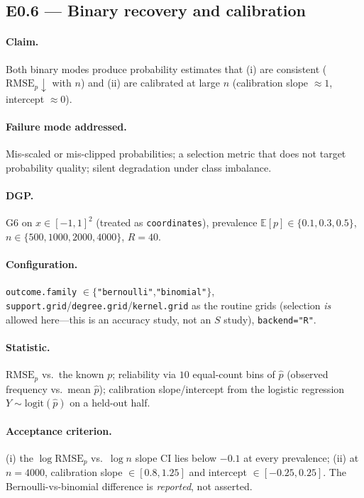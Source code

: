 \documentclass[11pt]{article}
\newcommand{\code}[1]{\texttt{#1}}
\newcommand{\rmse}{\mathrm{RMSE}}
\newcommand{\E}{\mathbb{E}}
\begin{document}
\subsection{E0.6 — Binary recovery and calibration}

\paragraph{Claim.} Both binary modes produce probability estimates that (i) are consistent
($\rmse_p\!\downarrow$ with $n$) and (ii) are calibrated at large $n$ (calibration slope
$\approx 1$, intercept $\approx 0$).

\paragraph{Failure mode addressed.} Mis-scaled or mis-clipped probabilities; a selection
metric that does not target probability quality; silent degradation under class imbalance.

\paragraph{DGP.} G6 on $x\in[-1,1]^2$ (treated as \code{coordinates}), prevalence
$\E[p]\in\{0.1,0.3,0.5\}$, $n\in\{500,1000,2000,4000\}$, $R=40$.

\paragraph{Configuration.} \code{outcome.family} $\in\{$\code{"bernoulli"},\code{"binomial"}$\}$,
\code{support.grid}/\code{degree.grid}/\code{kernel.grid} as the routine grids (selection
\emph{is} allowed here—this is an accuracy study, not an $S$ study), \code{backend="R"}.

\paragraph{Statistic.} $\rmse_p$ vs.\ the known $p$; reliability via $10$ equal-count bins of
$\hat p$ (observed frequency vs.\ mean $\hat p$); calibration slope/intercept from the logistic
regression $Y\sim \mathrm{logit}(\hat p)$ on a held-out half.

\paragraph{Acceptance criterion.} (i) the $\log\rmse_p$ vs.\ $\log n$ slope CI lies below
$-0.1$ at every prevalence; (ii) at $n=4000$, calibration slope $\in[0.8,1.25]$ and intercept
$\in[-0.25,0.25]$. The Bernoulli-vs-binomial difference is \emph{reported}, not asserted.
\end{document}
